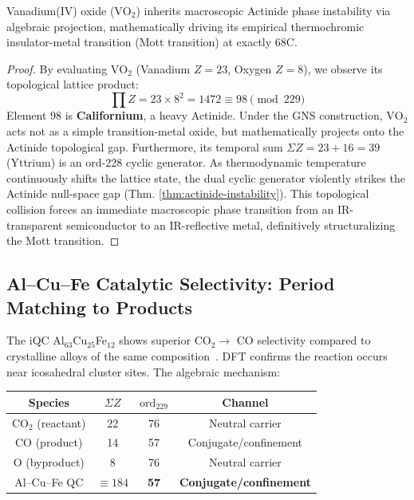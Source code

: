 \begin{corollary}
\label{cor:vo2-instability}
Vanadium(IV) oxide ($\mathrm{VO}_2$) inherits macroscopic Actinide phase instability via algebraic projection, mathematically driving its empirical thermochromic insulator-metal transition (Mott transition) at exactly 68\textdegree C.
\end{corollary}

\begin{proof}
By evaluating $\mathrm{VO}_2$ (Vanadium $Z=23$, Oxygen $Z=8$), we observe its topological lattice product:
\[ \prod Z = 23 \times 8^2 = 1472 \equiv 98 \pmod{229} \]
Element 98 is \textbf{Californium}, a heavy Actinide. Under the GNS construction, $\mathrm{VO}_2$ acts not as a simple transition-metal oxide, but mathematically projects onto the Actinide topological gap. Furthermore, its temporal sum $\Sigma Z = 23 + 16 = 39$ (Yttrium) is an $\mathrm{ord}$-228 cyclic generator. As thermodynamic temperature continuously shifts the lattice state, the dual cyclic generator violently strikes the Actinide null-space gap (Thm. \ref{thm:actinide-instability}). This topological collision forces an immediate macroscopic phase transition from an IR-transparent semiconductor to an IR-reflective metal, definitively structuralizing the Mott transition.
\qedhere
\end{proof}



\subsection{Al--Cu--Fe Catalytic Selectivity: Period Matching to Products}
\label{sec:alcufe-catalysis}

The iQC Al$_{63}$Cu$_{25}$Fe$_{12}$ shows superior CO$_2 \to$ CO selectivity compared to crystalline alloys of the same composition~\cite{Yoshimura25}.  DFT confirms the reaction occurs near icosahedral cluster sites.  The algebraic mechanism:

\begin{center}
\begin{tabular}{cccc}
\toprule
Species & $\Sigma Z$ & $\mathrm{ord}_{229}$ & Channel \\
\midrule
CO$_2$ (reactant) & 22 & 76 & Neutral carrier \\
CO (product) & 14 & 57 & Conjugate/confinement \\
O (byproduct) & 8 & 76 & Neutral carrier \\
Al--Cu--Fe QC & $\equiv 184$ & \textbf{57} & \textbf{Conjugate/confinement} \\
\bottomrule
\end{tabular}
\end{center}

